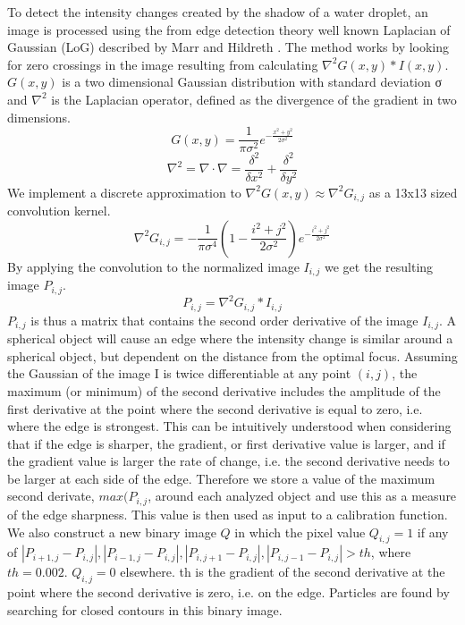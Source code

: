 To detect the intensity changes created by the shadow of a water droplet, an image is processed using the from edge detection theory well known Laplacian of Gaussian (LoG) described by Marr and Hildreth \cite{marr1980}. The method works by looking for zero crossings in the image resulting from calculating $\nabla^2 G\left(x,y\right) * I\left(x,y\right)$. $G\left(x,y\right)$ is a two dimensional Gaussian distribution with standard deviation σ and $\nabla^2$ is the Laplacian operator, defined as the divergence of the gradient in two dimensions.
\begin{equation}
G\left(x,y\right) = \frac{1}{\pi \sigma^2} e^{-\frac{x^2+y^2}{2\sigma^2}}
\end{equation}
\begin{equation}
\nabla^2=\nabla\cdot\nabla=\frac{\delta^2}{\delta x^2} + \frac{\delta^2}{\delta y^2}
\end{equation}
We implement a discrete approximation to $\nabla^2 G\left(x,y\right) \approx \nabla^2 G_{i,j}$ as a 13x13 sized convolution kernel.
\begin{equation}
\nabla^2 G_{i,j} = -\frac{1}{\pi \sigma^4} \left(1 - \frac{i^2+j^2}{2\sigma^2} \right) e^{-\frac{i^2+j^2}{2\sigma^2}}
\end{equation}
By applying the convolution to the normalized image $I_{i,j}$ we get the resulting image $P_{i,j}$.
\begin{equation}
P_{i,j}=\nabla^2 G_{i,j} * I_{i,j}
\end{equation}
$P_{i,j}$ is thus a matrix that contains the second order derivative of the image $I_{i,j}$. 
A spherical object will cause an edge where the intensity change is similar around a spherical object, but dependent on the distance from the optimal focus. Assuming the Gaussian of the image I is twice differentiable at any point $(i,j)$, the maximum (or minimum) of the second derivative includes the amplitude of the first derivative at the point where the second derivative is equal to zero, i.e. where the edge is strongest. This can be intuitively understood when considering that if the edge is sharper, the gradient, or first derivative value is larger, and if the gradient value is larger the rate of change, i.e. the second derivative needs to be larger at each side of the edge. Therefore we store a value of the maximum second derivate, $max(P_{i,j}$, around each analyzed object and use this as a measure of the edge sharpness. This value is then used as input to a calibration function. 
We also construct a new binary image $Q$ in which the pixel value $Q_{i,j}=1$ if any of $|P_{i+1,j}-P_{i,j} |,|P_{i-1,j}-P_{i,j} |,|P_{i,j+1}-P_{i,j} |,|P_{i,j-1}-P_{i,j} |>th$, where $th=0.002$. $Q_{i,j}=0$ elsewhere. th is the gradient of the second derivative at the point where the second derivative is zero, i.e. on the edge. Particles are found by searching for closed contours in this binary image.

